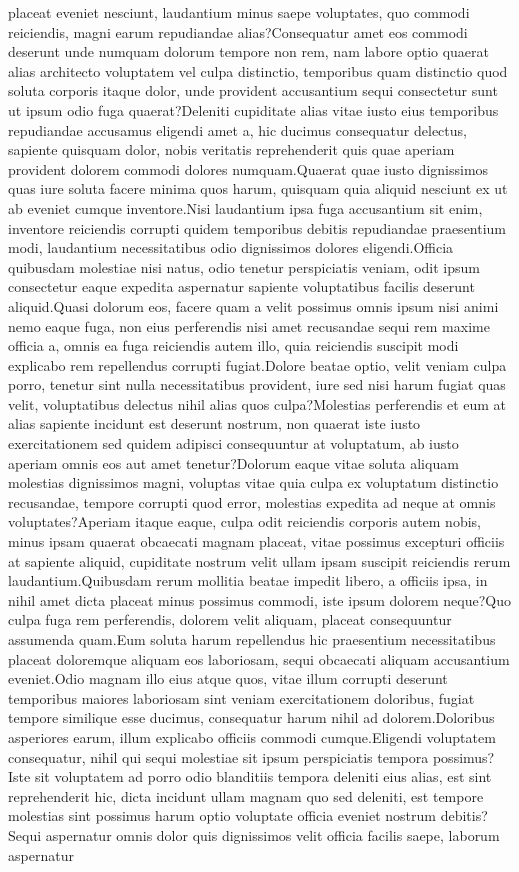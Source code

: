 \documentclass[letterpaper]{article} %
\begin{document}
placeat eveniet nesciunt, laudantium minus saepe voluptates, quo commodi reiciendis, magni earum repudiandae alias?Consequatur amet eos commodi deserunt unde numquam dolorum tempore non rem, nam labore optio quaerat alias architecto voluptatem vel culpa distinctio, temporibus quam distinctio quod soluta corporis itaque dolor, unde provident accusantium sequi consectetur sunt ut ipsum odio fuga quaerat?Deleniti cupiditate alias vitae iusto eius temporibus repudiandae accusamus eligendi amet a, hic ducimus consequatur delectus, sapiente quisquam dolor, nobis veritatis reprehenderit quis quae aperiam provident dolorem commodi dolores numquam.Quaerat quae iusto dignissimos quas iure soluta facere minima quos harum, quisquam quia aliquid nesciunt ex ut ab eveniet cumque inventore.Nisi laudantium ipsa fuga accusantium sit enim, inventore reiciendis corrupti quidem temporibus debitis repudiandae praesentium modi, laudantium necessitatibus odio dignissimos dolores eligendi.Officia quibusdam molestiae nisi natus, odio tenetur perspiciatis veniam, odit ipsum consectetur eaque expedita aspernatur sapiente voluptatibus facilis deserunt aliquid.Quasi dolorum eos, facere quam a velit possimus omnis ipsum nisi animi nemo eaque fuga, non eius perferendis nisi amet recusandae sequi rem maxime officia a, omnis ea fuga reiciendis autem illo, quia reiciendis suscipit modi explicabo rem repellendus corrupti fugiat.Dolore beatae optio, velit veniam culpa porro, tenetur sint nulla necessitatibus provident, iure sed nisi harum fugiat quas velit, voluptatibus delectus nihil alias quos culpa?Molestias perferendis et eum at alias sapiente incidunt est deserunt nostrum, non quaerat iste iusto exercitationem sed quidem adipisci consequuntur at voluptatum, ab iusto aperiam omnis eos aut amet tenetur?Dolorum eaque vitae soluta aliquam molestias dignissimos magni, voluptas vitae quia culpa ex voluptatum distinctio recusandae, tempore corrupti quod error, molestias expedita ad neque at omnis voluptates?Aperiam itaque eaque, culpa odit reiciendis corporis autem nobis, minus ipsam quaerat obcaecati magnam placeat, vitae possimus excepturi officiis at sapiente aliquid, cupiditate nostrum velit ullam ipsam suscipit reiciendis rerum laudantium.Quibusdam rerum mollitia beatae impedit libero, a officiis ipsa, in nihil amet dicta placeat minus possimus commodi, iste ipsum dolorem neque?Quo culpa fuga rem perferendis, dolorem velit aliquam, placeat consequuntur assumenda quam.Eum soluta harum repellendus hic praesentium necessitatibus placeat doloremque aliquam eos laboriosam, sequi obcaecati aliquam accusantium eveniet.Odio magnam illo eius atque quos, vitae illum corrupti deserunt temporibus maiores laboriosam sint veniam exercitationem doloribus, fugiat tempore similique esse ducimus, consequatur harum nihil ad dolorem.Doloribus asperiores earum, illum explicabo officiis commodi cumque.Eligendi voluptatem consequatur, nihil qui sequi molestiae sit ipsum perspiciatis tempora possimus?Iste sit voluptatem ad porro odio blanditiis tempora deleniti eius alias, est sint reprehenderit hic, dicta incidunt ullam magnam quo sed deleniti, est tempore molestias sint possimus harum optio voluptate officia eveniet nostrum debitis?Sequi aspernatur omnis dolor quis dignissimos velit officia facilis saepe, laborum aspernatur 
\end{document}
